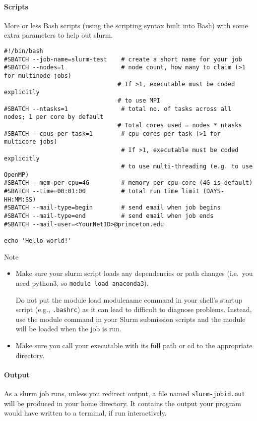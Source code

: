 \documentclass[12pt]{article}
\theoremstyle{plain}
\theoremstyle{definition}
\theoremstyle{remark}
\begin{document}
\paragraph{Scripts}
More or less Bash scripts (using the scripting syntax built into Bash)
with some extra parameters to help out slurm.
\lstset{style=bash}
\begin{lstlisting}
#!/bin/bash
#SBATCH --job-name=slurm-test    # create a short name for your job
#SBATCH --nodes=1                # node count, how many to claim (>1 for multinode jobs)
                                # If >1, executable must be coded explicitly
                                # to use MPI
#SBATCH --ntasks=1               # total no. of tasks across all nodes; 1 per core by default
                                # Total cores used = nodes * ntasks
#SBATCH --cpus-per-task=1        # cpu-cores per task (>1 for multicore jobs)
                                 # If >1, executable must be coded explicitly
                                 # to use multi-threading (e.g. to use OpenMP)
#SBATCH --mem-per-cpu=4G         # memory per cpu-core (4G is default)
#SBATCH --time=00:01:00          # total run time limit (DAYS-HH:MM:SS)
#SBATCH --mail-type=begin        # send email when job begins
#SBATCH --mail-type=end          # send email when job ends
#SBATCH --mail-user=<YourNetID>@princeton.edu

echo 'Hello world!'
\end{lstlisting}
Note
\begin{itemize}
  \item Make sure your slurm script loads any dependencies or path
    changes (i.e.\ you need python3, so \texttt{module load anaconda3}).

    Do not put the module load modulename command in your shell's
    startup script (e.g., \texttt{.bashrc}) as it can lead to difficult
    to diagnose problems.  Instead, use the module command in your Slurm
    submission scripts and the module will be loaded when the job is
    run.
  \item Make sure you call your executable with its full path or cd to
    the appropriate directory.
\end{itemize}


\paragraph{Output}
As a slurm job runs, unless you redirect output, a file named
\texttt{slurm-jobid.out} will be produced in your home directory.
It contains the output your program would have written to a terminal, if
run interactively.
\end{document}
